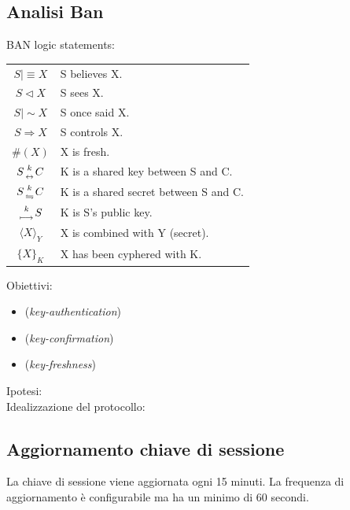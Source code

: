 \documentclass[a4paper,titlepage]{article}
\begin{document}
\subsection{Analisi Ban}

BAN logic statements:
\begin{center}
\begin{tabular}{|c | l|} \hline
$ S \mid \equiv X  $ & S believes X.\\
$ S \lhd X  $ & S sees X.\\
$ S \mid \sim X  $ & S once said X.\\
$ S \Rightarrow X $ & S controls X.\\ 
$ \#(X) $ & X is fresh.\\
$S {k \atop \leftrightarrow} C $ & K is a shared key between S and C.\\ 
$S {k \atop \leftrightharpoons} C $ & K is a shared secret between S and C.\\ 
${k  \atop \longmapsto} S $ & K is S's public key.\\
$\langle X \rangle_{Y}$ & X is combined with Y (secret).\\
$\{X\}_{K}$ & X has been cyphered with K.\\ \hline
\end{tabular}
\end{center}

Obiettivi:
\begin{itemize}
\item {}  (\textit{key-authentication})
\item {}  (\textit{key-confirmation})
\item {}  (\textit{key-freshness})
\end{itemize}

Ipotesi:\\

Idealizzazione del protocollo:\\


\subsection{Aggiornamento chiave di sessione}
La chiave di sessione viene aggiornata ogni 15 minuti. La frequenza di aggiornamento è configurabile ma ha un minimo di 60 secondi. 
\end{document}
